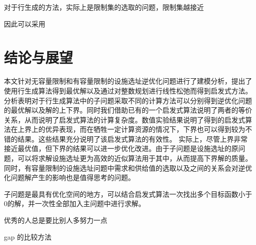 \documentclass[UTF8]{article}
\begin{document}
对于行生成的方法，实际上是限制集的选取的问题，限制集越接近

因此可以采用

\section{结论与展望}
本文针对无容量限制和有容量限制的设施选址逆优化问题进行了建模分析，提出了使用行生成算法得到最优解以及通过对整数规划进行线性松弛而得到启发式方法。分析表明对于行生成算法中的子问题采取不同的计算方法可以分别得到逆优化问题的最优解以及解的上下界。同时我们借助已有的一个启发式算法说明了两者的等价关系，从而说明了启发式算法的计算复杂度。数值实验结果说明了得到的启发式算法在上界上的优异表现，而在牺牲一定计算资源的情况下，下界也可以得到较为不错的结果。这些结果充分说明了该启发式算法的有效性。
实际上，尽管上界非常接近最优值，但下界的结果可以进一步优化改进。由于子问题是设施选址的原问题，可以将求解设施选址更为高效的近似算法用于其中，从而提高下界解的质量。同时，有容量限制的设施选址问题中需求和供给值的选取以及之间的关系会对逆优化问题解产生的影响也是值得思考的问题。

子问题是最具有优化空间的地方，可以结合启发式算法一次找出多个目标函数小于0的解，并一次性全部加入主问题中进行求解。

优秀的人总是要比别人多努力一点

gap 的比较方法
\end{document}
